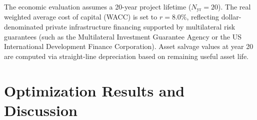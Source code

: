 \documentclass[11pt,a4paper]{article}
\begin{document}
\begin{table}[htbp]
\centering
\caption{Techno-Economic Parameters Used in Microgrid Optimization.}
\label{tab:costs}
\end{table}

The economic evaluation assumes a 20-year project lifetime ($N_{\text{yr}} = 20$). The real weighted average cost of capital (WACC) is set to $r = 8.0\%$, reflecting dollar-denominated private infrastructure financing supported by multilateral risk guarantees (such as the Multilateral Investment Guarantee Agency or the US International Development Finance Corporation). Asset salvage values at year 20 are computed via straight-line depreciation based on remaining useful asset life.
\section{Optimization Results and Discussion}
\label{sec:results}
\end{document}
